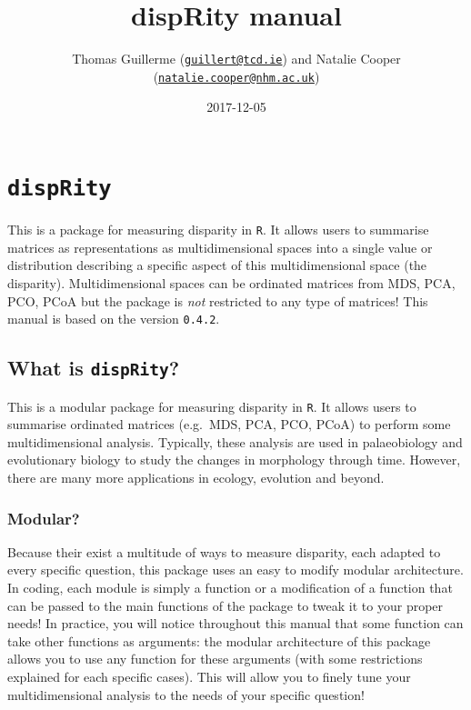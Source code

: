 \documentclass[]{book}
\title{dispRity manual}
\author{Thomas Guillerme
(\href{mailto:guillert@tcd.ie}{\nolinkurl{guillert@tcd.ie}}) and Natalie
Cooper
(\href{mailto:natalie.cooper@nhm.ac.uk}{\nolinkurl{natalie.cooper@nhm.ac.uk}})}
\date{2017-12-05}
\theoremstyle{definition}
\theoremstyle{definition}
\theoremstyle{remark}
\begin{document}
\maketitle

{
\setcounter{tocdepth}{1}
\tableofcontents
}
\chapter{\texorpdfstring{\texttt{dispRity}}{dispRity}}\label{disprity}

This is a package for measuring disparity in \texttt{R}. It allows users
to summarise matrices as representations as multidimensional spaces into
a single value or distribution describing a specific aspect of this
multidimensional space (the disparity). Multidimensional spaces can be
ordinated matrices from MDS, PCA, PCO, PCoA but the package is
\emph{not} restricted to any type of matrices! This manual is based on
the version \texttt{0.4.2}.

\section{\texorpdfstring{What is
\texttt{dispRity}?}{What is dispRity?}}\label{what-is-disprity}

This is a modular package for measuring disparity in \texttt{R}. It
allows users to summarise ordinated matrices (e.g.~MDS, PCA, PCO, PCoA)
to perform some multidimensional analysis. Typically, these analysis are
used in palaeobiology and evolutionary biology to study the changes in
morphology through time. However, there are many more applications in
ecology, evolution and beyond.

\subsection{Modular?}\label{modular}

Because their exist a multitude of ways to measure disparity, each
adapted to every specific question, this package uses an easy to modify
modular architecture. In coding, each module is simply a function or a
modification of a function that can be passed to the main functions of
the package to tweak it to your proper needs! In practice, you will
notice throughout this manual that some function can take other
functions as arguments: the modular architecture of this package allows
you to use any function for these arguments (with some restrictions
explained for each specific cases). This will allow you to finely tune
your multidimensional analysis to the needs of your specific question!
\end{document}
